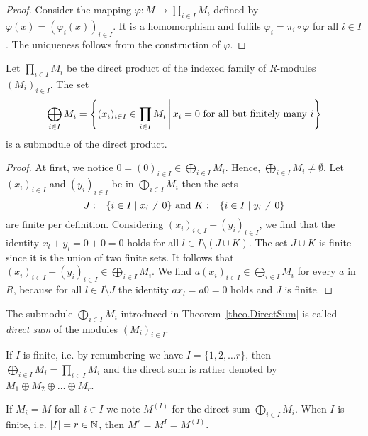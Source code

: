 \begin{proof}
Consider the mapping $\varphi\colon M\to \prod_{i\in I} M_i$ defined by $\varphi(x)=(\varphi_i(x))_{i\in I}$. It is a homomorphism and fulfils $\varphi_i=\pi_i\circ\varphi$ for all $i\in I$. The uniqueness follows from the construction of $\varphi$.
\end{proof}

\begin{thm}\label{theo.DirectSum}
Let $\prod_{i\in I} M_i$ be the direct product of the indexed family of $R$-modules $(M_i)_{i\in I}$. The set
\begin{equation*}
\bigoplus_{i\in I}M_i=\left\lbrace (x_i)_{i\in I}\in \prod_{i\in I} M_i \middle\arrowvert x_i=0 \textnormal{ for all but finitely many } i\right\rbrace
\end{equation*}
is a submodule of the direct product.
\end{thm}

\begin{proof}
At first, we notice $0=(0)_{i\in I}\in \bigoplus_{i\in I}M_i$. Hence, $\bigoplus_{i\in I}M_i\neq\emptyset$. Let $(x_i)_{i\in I}$ and $(y_i)_{i\in I}$ be in $\bigoplus_{i\in I}M_i$ then the sets
\begin{equation*}
J:=\lbrace i\in I\mid x_i\neq 0\rbrace \textnormal{ and } K:=\lbrace i\in I\mid y_i\neq 0\rbrace
\end{equation*} 
are finite per definition. Considering $(x_i)_{i\in I}+(y_i)_{i\in I}$, we find that the identity $x_l+y_l=0+0=0$ holds for all $l\in I\setminus (J\cup K)$. The set $J\cup K$ is finite since it is the union of two finite sets. It follows that $(x_i)_{i\in I}+(y_i)_{i\in I}\in \bigoplus_{i\in I}M_i$. We find $a(x_i)_{i\in I}\in \bigoplus_{i\in I}M_i$ for every $a$ in $R$, because for all $l\in I\setminus J$ the identity $ax_l=a0=0$ holds and $J$ is finite.
\end{proof}

\begin{defin}
\begin{exlist}
\item The submodule $\bigoplus_{i\in I}M_i$ introduced in Theorem~\ref{theo.DirectSum} is called \emph{direct sum} of the modules $(M_i)_{i\in I}$.
\item If $I$ is finite, i.e. by renumbering we have $I=\lbrace 1,2,\ldots r\rbrace$, then $\bigoplus_{i\in I}M_i=\prod_{i\in I} M_i$ and the direct sum is rather denoted by $M_1\oplus M_2\oplus\ldots\oplus M_r$.
\item If $M_i=M$ for all $i\in I$ we note $M^{(I)}$ for the direct sum $\bigoplus_{i\in I}M_i$. When $I$ is finite, i.e. $|I|=r\in\operatorname{\mathbb{N}}$, then $M^r=M^I=M^{(I)}$.
\end{exlist}
\end{defin}

